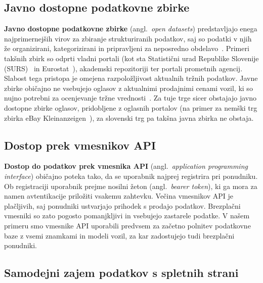 \documentclass[a4paper,12pt,openright]{book}
\begin{document}
\subsection{Javno dostopne podatkovne zbirke}

\textbf{Javno dostopne podatkovne zbirke} (angl.\ \emph{open datasets}) predstavljajo enega najprimernejših virov za zbiranje strukturiranih podatkov,
 saj so podatki v njih že organizirani, kategorizirani in pripravljeni za neposredno
  obdelavo~\cite{janssen2012open}. Primeri takšnih zbirk so odprti vladni portali (kot sta Statistični urad Republike
 Slovenije (SURS)~\cite{surs} in Eurostat~\cite{eurostat}), akademski repozitoriji ter portali prometnih agencij.
  Slabost tega pristopa je omejena razpoložljivost aktualnih tržnih podatkov.
Javne zbirke običajno ne vsebujejo oglasov z aktualnimi prodajnimi cenami vozil,
ki so nujno potrebni za ocenjevanje tržne vrednosti~\cite{gegic2019car}.
Za tuje trge sicer obstajajo javno dostopne zbirke oglasov, pridobljene z
oglasnih portalov (na primer za nemški trg zbirka eBay Kleinanzeigen~\cite{ebay_de_dataset}),
za slovenski trg pa takšna javna zbirka ne obstaja.

\subsection{Dostop prek vmesnikov API}
\textbf{Dostop do podatkov prek vmesnika API} (angl.\ \emph{application programming interface}) običajno poteka tako, da se uporabnik najprej registrira pri ponudniku.
Ob registraciji uporabnik prejme nosilni žeton (angl.\ \emph{bearer token}), ki ga mora za namen avtentikacije priložiti vsakemu zahtevku. Večina vmesnikov API je plačljivih, saj ponudniki ustvarjajo prihodek s prodajo podatkov.
 Brezplačni vmesniki so zato pogosto pomanjkljivi in vsebujejo zastarele podatke. V našem primeru smo vmesnike API uporabili
  predvsem za začetno polnitev podatkovne baze z vsemi znamkami in modeli vozil, za kar zadostujejo tudi brezplačni ponudniki.

\subsection{Samodejni zajem podatkov s spletnih strani}
\end{document}
